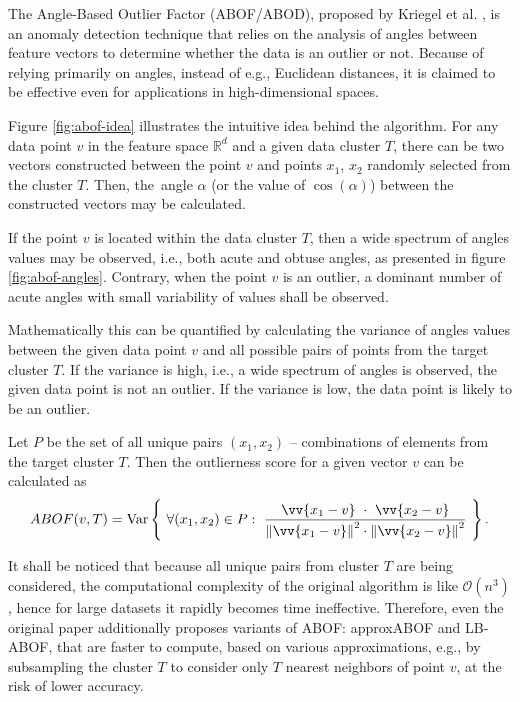 The Angle-Based Outlier Factor (ABOF/ABOD), proposed by Kriegel et al. \cite{Kriegel-2008}, is an anomaly detection technique that relies on the analysis of angles between feature vectors to determine whether the data is an outlier or not. Because of relying primarily on angles, instead of e.g., Euclidean distances, it is claimed to be effective even for applications in high-dimensional spaces.

Figure \ref{fig:abof-idea} illustrates the intuitive idea behind the algorithm. For any data point $v$ in the feature space $\mathbb{R}^d$ and a given data cluster $T$, there can be two vectors constructed between the point $v$ and points $x_1$, $x_2$ randomly selected from the cluster $T$. Then, the~angle $\alpha$ (or the value of $\cos(\alpha)$) between the constructed vectors may be calculated.

If the point $v$ is located within the data cluster $T$, then a wide spectrum of angles values may be observed, i.e., both acute and obtuse angles, as presented in figure \ref{fig:abof-angles}. Contrary, when the point $v$ is an outlier, a dominant number of acute angles with small variability of values shall be observed.

Mathematically this can be quantified by calculating the variance of angles values between the given data point $v$ and all possible pairs of points from the target cluster $T$. If the variance is high, i.e., a wide spectrum of angles is observed, the given data point is not an outlier. If the variance is low, the data point is likely to be an outlier.

Let $P$ be the set of all unique pairs $(x_1, x_2)$ – combinations of elements from the target cluster $T$. Then the outlierness score for a given vector $v$ can be calculated as
\begin{equation}
    ABOF(v, T) = \mathrm{Var}\left\{
        ~
        \forall (x_1, x_2) \in P:
        ~
        \frac{
            \vv{x_1 - v} ~\cdot~ \vv{x_2 - v}
        }{
            \norm{\vv{x_1 - v}}^2 \cdot \norm{\vv{x_2 - v}}^2
        }
        ~
    \right\}.
    \label{eq:abof}
\end{equation}

It shall be noticed that because all unique pairs from cluster $T$ are being considered, the computational complexity of the original algorithm is like $\mathcal{O}(n^3)$, hence for large datasets it rapidly becomes time ineffective. Therefore, even the original paper \cite{Kriegel-2008} additionally proposes variants of ABOF: approxABOF and LB-ABOF, that are faster to compute, based on various approximations, e.g., by subsampling the cluster $T$ to consider only $T$ nearest neighbors of point $v$, at the risk of lower accuracy.

